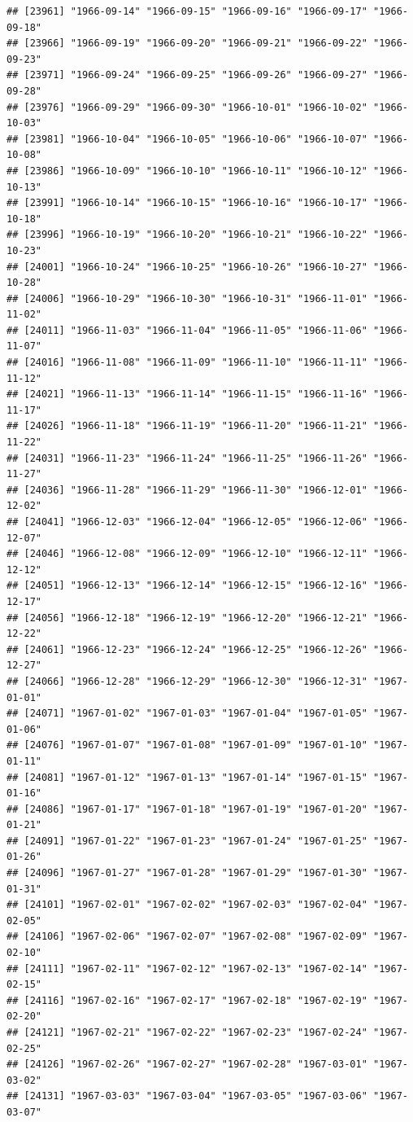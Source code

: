 \documentclass{article}\usepackage[]{graphicx}\usepackage[]{color}
\makeatletter
\newenvironment{kframe}{%
 \def\at@end@of@kframe{}%
 \ifinner\ifhmode%
  \def\at@end@of@kframe{\end{minipage}}%
  \begin{minipage}{\columnwidth}%
 \fi\fi%
 \def\FrameCommand##1{\hskip\@totalleftmargin \hskip-\fboxsep
 \colorbox{shadecolor}{##1}\hskip-\fboxsep
     \hskip-\linewidth \hskip-\@totalleftmargin \hskip\columnwidth}%
 \MakeFramed {\advance\hsize-\width
   \@totalleftmargin\z@ \linewidth\hsize
   \@setminipage}}%
 {\par\unskip\endMakeFramed%
 \at@end@of@kframe}
\newenvironment{knitrout}{}{} %
\makeatother
\begin{document}
\begin{description}
\begin{knitrout}
\begin{kframe}
\begin{verbatim}
## [23961] "1966-09-14" "1966-09-15" "1966-09-16" "1966-09-17" "1966-09-18"
## [23966] "1966-09-19" "1966-09-20" "1966-09-21" "1966-09-22" "1966-09-23"
## [23971] "1966-09-24" "1966-09-25" "1966-09-26" "1966-09-27" "1966-09-28"
## [23976] "1966-09-29" "1966-09-30" "1966-10-01" "1966-10-02" "1966-10-03"
## [23981] "1966-10-04" "1966-10-05" "1966-10-06" "1966-10-07" "1966-10-08"
## [23986] "1966-10-09" "1966-10-10" "1966-10-11" "1966-10-12" "1966-10-13"
## [23991] "1966-10-14" "1966-10-15" "1966-10-16" "1966-10-17" "1966-10-18"
## [23996] "1966-10-19" "1966-10-20" "1966-10-21" "1966-10-22" "1966-10-23"
## [24001] "1966-10-24" "1966-10-25" "1966-10-26" "1966-10-27" "1966-10-28"
## [24006] "1966-10-29" "1966-10-30" "1966-10-31" "1966-11-01" "1966-11-02"
## [24011] "1966-11-03" "1966-11-04" "1966-11-05" "1966-11-06" "1966-11-07"
## [24016] "1966-11-08" "1966-11-09" "1966-11-10" "1966-11-11" "1966-11-12"
## [24021] "1966-11-13" "1966-11-14" "1966-11-15" "1966-11-16" "1966-11-17"
## [24026] "1966-11-18" "1966-11-19" "1966-11-20" "1966-11-21" "1966-11-22"
## [24031] "1966-11-23" "1966-11-24" "1966-11-25" "1966-11-26" "1966-11-27"
## [24036] "1966-11-28" "1966-11-29" "1966-11-30" "1966-12-01" "1966-12-02"
## [24041] "1966-12-03" "1966-12-04" "1966-12-05" "1966-12-06" "1966-12-07"
## [24046] "1966-12-08" "1966-12-09" "1966-12-10" "1966-12-11" "1966-12-12"
## [24051] "1966-12-13" "1966-12-14" "1966-12-15" "1966-12-16" "1966-12-17"
## [24056] "1966-12-18" "1966-12-19" "1966-12-20" "1966-12-21" "1966-12-22"
## [24061] "1966-12-23" "1966-12-24" "1966-12-25" "1966-12-26" "1966-12-27"
## [24066] "1966-12-28" "1966-12-29" "1966-12-30" "1966-12-31" "1967-01-01"
## [24071] "1967-01-02" "1967-01-03" "1967-01-04" "1967-01-05" "1967-01-06"
## [24076] "1967-01-07" "1967-01-08" "1967-01-09" "1967-01-10" "1967-01-11"
## [24081] "1967-01-12" "1967-01-13" "1967-01-14" "1967-01-15" "1967-01-16"
## [24086] "1967-01-17" "1967-01-18" "1967-01-19" "1967-01-20" "1967-01-21"
## [24091] "1967-01-22" "1967-01-23" "1967-01-24" "1967-01-25" "1967-01-26"
## [24096] "1967-01-27" "1967-01-28" "1967-01-29" "1967-01-30" "1967-01-31"
## [24101] "1967-02-01" "1967-02-02" "1967-02-03" "1967-02-04" "1967-02-05"
## [24106] "1967-02-06" "1967-02-07" "1967-02-08" "1967-02-09" "1967-02-10"
## [24111] "1967-02-11" "1967-02-12" "1967-02-13" "1967-02-14" "1967-02-15"
## [24116] "1967-02-16" "1967-02-17" "1967-02-18" "1967-02-19" "1967-02-20"
## [24121] "1967-02-21" "1967-02-22" "1967-02-23" "1967-02-24" "1967-02-25"
## [24126] "1967-02-26" "1967-02-27" "1967-02-28" "1967-03-01" "1967-03-02"
## [24131] "1967-03-03" "1967-03-04" "1967-03-05" "1967-03-06" "1967-03-07"

\end{verbatim}
\end{kframe}
\end{knitrout}
\end{description}
\end{document}
